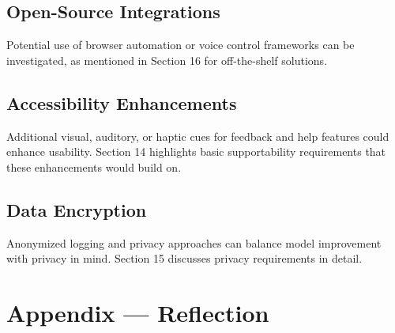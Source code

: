 \documentclass[12pt]{article}
\begin{document}
\subsection{Open-Source Integrations}
Potential use of browser automation or voice control frameworks can be investigated, as mentioned in Section 16 for off-the-shelf solutions.

\subsection{Accessibility Enhancements}
Additional visual, auditory, or haptic cues for feedback and help features could enhance usability. Section 14 highlights basic supportability requirements that these enhancements would build on.

\subsection{Data Encryption}
Anonymized logging and privacy approaches can balance model improvement with privacy in mind. Section 15 discusses privacy requirements in detail.


\newpage{}
\section*{Appendix --- Reflection}




\end{document}

